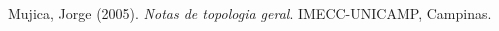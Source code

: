 \documentclass[a4paper, 11pt]{article}
\begin{document}
\theoremstyle{remark}
\newtheorem*{example}{Ejemplo}
\newtheorem*{exercise}{Ejercicio}
\newtheorem*{note}{\(*\)}

\newcommand{\R}{\mathbb{R}}
\newcommand{\N}{\mathbb{N}}
\newcommand{\U}{\mathcal{U}}
\newcommand{\V}{\mathcal{V}}
\newcommand{\F}{\mathcal{F}}
\newcommand{\E}{\vspace{0.2in}}
\newcommand{\ab}{{\rotatebox{0}{\scriptsize$\lor$}}}
\newcommand{\ce}{{\text{\ \large \rotatebox{90}{$\triangleleft$}}}}














\begin{thebibliography}{9}

Mujica, Jorge (2005). \textit{Notas de topologia geral}. IMECC-UNICAMP, Campinas.

\end{thebibliography}

\end{document}
